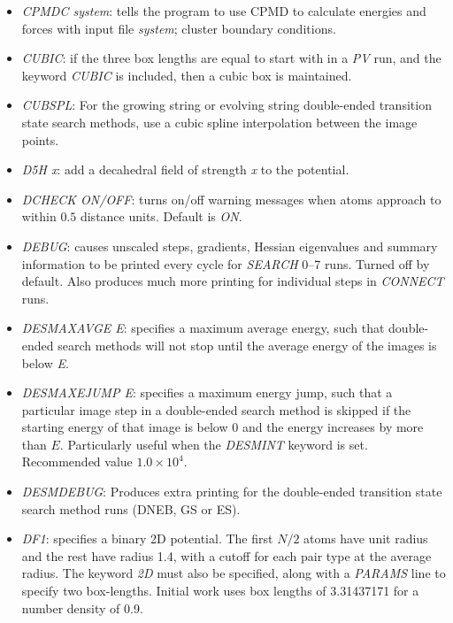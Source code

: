 \documentclass[12pt,a4paper,dvips]{article}
\begin{document}
\begin{itemize}
\item {\it CPMDC system\/}: tells the program to use CPMD to calculate energies and
forces with input file {\it system\/}; cluster boundary conditions.

\item {\it CUBIC\/}: if the three box lengths are equal to start with in a {\it PV\/} run,
and the keyword {\it CUBIC \/} is included, then a cubic box is maintained. 

\item {\it CUBSPL\/}: For the growing string or evolving string double-ended
  transition state search methods, use a cubic spline interpolation between
  the image points.

\item {\it D5H x\/}: add a decahedral field of strength {\it x} to the potential.

\item {\it DCHECK ON/OFF\/}: turns on/off warning messages when atoms
approach to within $0.5$ distance units. Default is {\it ON\/}.

\item {\it DEBUG\/}: causes unscaled steps, gradients, Hessian eigenvalues and
summary information to be printed every cycle for {\it SEARCH} 0--7 runs. Turned off by default.
Also produces much more printing for individual steps in {\it CONNECT\/} runs.

\item {\it DESMAXAVGE E\/}: specifies a maximum average energy, such that
  double-ended search methods will not stop until the average energy of the
  images is below {\it E\/}. 

\item {\it DESMAXEJUMP E\/}: specifies a maximum energy jump, such that a
  particular image step in a double-ended search method is skipped if the
  starting energy of that image is below $0$ and the energy increases by more
  than $E$. Particularly useful when the {\it DESMINT\/} keyword is
  set. Recommended value $1.0\times10^4$.

\item {\it DESMDEBUG\/}: Produces extra printing for the double-ended
  transition state search method runs (DNEB, GS or ES).

\item {\it DF1\/}: specifies a binary 2D potential.
The first $N/2$ atoms have unit radius and the rest 
have radius 1.4, with a cutoff for each pair type at the
average radius.
The keyword {\it 2D\/} must also be specified, along with a 
{\it PARAMS\/} line to specify two box-lengths.
Initial work uses box lengths of 3.31437171 for a number density of 0.9.


\end{itemize}
\end{document}
